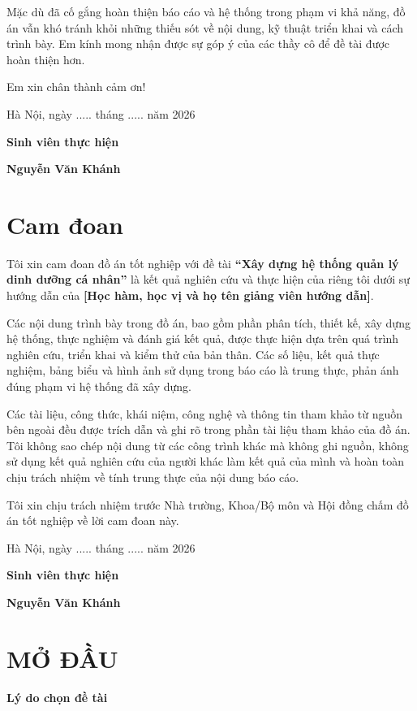 \documentclass[12pt, a4paper]{report}
\begin{document}
Mặc dù đã cố gắng hoàn thiện báo cáo và hệ thống trong phạm vi khả năng, đồ án vẫn khó tránh khỏi những thiếu sót về nội dung, kỹ thuật triển khai và cách trình bày. Em kính mong nhận được sự góp ý của các thầy cô để đề tài được hoàn thiện hơn.

Em xin chân thành cảm ơn!

Hà Nội, ngày ..... tháng ..... năm 2026

\textbf{Sinh viên thực hiện}

\textbf{Nguyễn Văn Khánh}


\chapter*{Cam đoan}
Tôi xin cam đoan đồ án tốt nghiệp với đề tài \textbf{“Xây dựng hệ thống quản lý dinh dưỡng cá nhân”} là kết quả nghiên cứu và thực hiện của riêng tôi dưới sự hướng dẫn của \textbf{[Học hàm, học vị và họ tên giảng viên hướng dẫn]}.

Các nội dung trình bày trong đồ án, bao gồm phần phân tích, thiết kế, xây dựng hệ thống, thực nghiệm và đánh giá kết quả, được thực hiện dựa trên quá trình nghiên cứu, triển khai và kiểm thử của bản thân. Các số liệu, kết quả thực nghiệm, bảng biểu và hình ảnh sử dụng trong báo cáo là trung thực, phản ánh đúng phạm vi hệ thống đã xây dựng.

Các tài liệu, công thức, khái niệm, công nghệ và thông tin tham khảo từ nguồn bên ngoài đều được trích dẫn và ghi rõ trong phần tài liệu tham khảo của đồ án. Tôi không sao chép nội dung từ các công trình khác mà không ghi nguồn, không sử dụng kết quả nghiên cứu của người khác làm kết quả của mình và hoàn toàn chịu trách nhiệm về tính trung thực của nội dung báo cáo.

Tôi xin chịu trách nhiệm trước Nhà trường, Khoa/Bộ môn và Hội đồng chấm đồ án tốt nghiệp về lời cam đoan này.

Hà Nội, ngày ..... tháng ..... năm 2026

\textbf{Sinh viên thực hiện}

\textbf{Nguyễn Văn Khánh}

		
\clearpage
\renewcommand{\contentsname}{\centering MỤC LỤC}
\tableofcontents
\clearpage
{}

\chapter*{MỞ ĐẦU}
\textbf{Lý do chọn đề tài}
\end{document}
